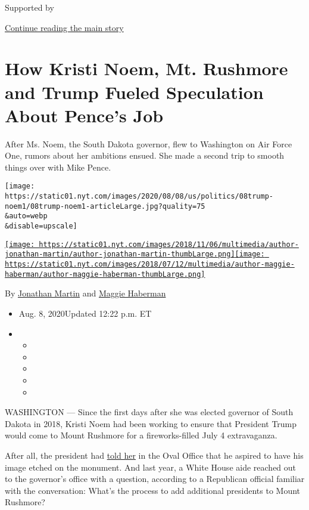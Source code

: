 Supported by

\protect\hyperlink{after-sponsor}{Continue reading the main story}

\hypertarget{how-kristi-noem-mt-rushmore-and-trump-fueled-speculation-about-pences-job}{%
\section{How Kristi Noem, Mt. Rushmore and Trump Fueled Speculation
About Pence's
Job}\label{how-kristi-noem-mt-rushmore-and-trump-fueled-speculation-about-pences-job}}

After Ms. Noem, the South Dakota governor, flew to Washington on Air
Force One, rumors about her ambitions ensued. She made a second trip to
smooth things over with Mike Pence.

\texttt{[image: https://static01.nyt.com/images/2020/08/08/us/politics/08trump-noem1/08trump-noem1-articleLarge.jpg?quality=75\\\&auto=webp\\\&disable=upscale]}

\href{https://www.nytimes.com/by/jonathan-martin}{\texttt{[image: https://static01.nyt.com/images/2018/11/06/multimedia/author-jonathan-martin/author-jonathan-martin-thumbLarge.png]}}\href{https://www.nytimes.com/by/maggie-haberman}{\texttt{[image: https://static01.nyt.com/images/2018/07/12/multimedia/author-maggie-haberman/author-maggie-haberman-thumbLarge.png]}}

By \href{https://www.nytimes.com/by/jonathan-martin}{Jonathan Martin}
and \href{https://www.nytimes.com/by/maggie-haberman}{Maggie Haberman}

\begin{itemize}
\item
  Aug. 8, 2020Updated 12:22 p.m. ET
\item
  \begin{itemize}
  \item
  \item
  \item
  \item
  \item
  \end{itemize}
\end{itemize}

WASHINGTON --- Since the first days after she was elected governor of
South Dakota in 2018, Kristi Noem had been working to ensure that
President Trump would come to Mount Rushmore for a fireworks-filled July
4 extravaganza.

After all, the president had
\href{https://www.argusleader.com/story/news/2018/04/24/president-donald-trump-mount-rushmore-trumpmore/544597002/}{told
her} in the Oval Office that he aspired to have his image etched on the
monument. And last year, a White House aide reached out to the
governor's office with a question, according to a Republican official
familiar with the conversation: What's the process to add additional
presidents to Mount Rushmore?

